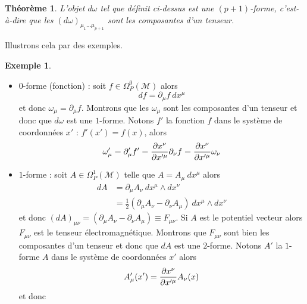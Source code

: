\documentclass[a4paper,11pt]{report}
\theoremstyle{definition}
\theoremstyle{plain}
\newtheorem{thm}{Théorème}[chapter]
\theoremstyle{definition}
\newtheorem{exmp}{Exemple}[chapter]
\theoremstyle{remark}
\newcommand{\M}{\mathscr{M}}
\newcommand{\p}{\partial}
\begin{document}
            \begin{thm}
                L'objet $d\omega$ tel que définit ci-dessus est une $(p+1)$-forme, c'est-à-dire que les $(d\omega)_{\mu_1 \dots\mu_{p+1}}$ sont les composantes d'un tenseur.
            \end{thm}
            
            Illustrons cela par des exemples.
            
            \begin{exmp}${}$
                \begin{itemize}[label = \textbullet]
                    \item $0$-forme (fonction) : soit $f\in\Omega_P^0(\M)$ alors 
                        \begin{equation}
                            df = \p_\mu f ~dx^\mu
                        \end{equation}
                        et donc $\omega_\mu = \p_\mu f$. Montrons que les $\omega_\mu$ sont les composantes d'un tenseur et donc que $d\omega$ est une $1$-forme. Notons $f'$ la fonction $f$ dans le système de coordonnées $x'$ : $f'(x') = f(x)$, alors
                        \begin{equation}
                            \omega'_\mu = \p'_\mu f' = \pdv{x^\nu}{x'^\mu}\p_{\nu}f = \pdv{x^\nu}{x'^\mu} \omega_\nu
                        \end{equation}
                    \item $1$-forme : soit $A\in\Omega_P^1(\M)$ telle que $A=A_\mu~dx^\mu$ alors
                        \begin{align}
                            dA &= \p_\mu A_\nu~dx^\mu\wedge dx^\nu\\
                            &= \frac{1}{2} (\p_\mu A_\nu-\p_\nu A_\mu)~dx^\mu\wedge dx^\nu
                        \end{align}
                        et donc $(dA)_{\mu\nu} = (\p_\mu A_\nu-\p_\nu A_\mu)\equiv F_{\mu\nu}$. Si $A$ est le potentiel vecteur alors $F_{\mu\nu}$ est le tenseur électromagnétique. Montrons que $F_{\mu\nu}$ sont bien les composantes d'un tenseur et donc que $dA$ est une $2$-forme. Notons $A'$ la $1$-forme $A$ dans le système de coordonnées $x'$ alors 
                        \begin{equation}
                            A'_\mu(x') = \pdv{x^\nu}{x'^\mu} A_\nu(x)
                        \end{equation}
                        et donc 
                        \begin{equation}

\end{equation}
\end{itemize}
\end{exmp}
\end{document}
